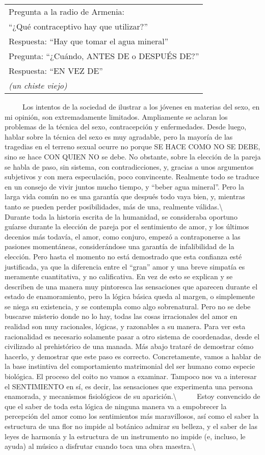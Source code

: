 \begin{longtable}[]{@{}l@{}}
\toprule
Pregunta a la radio de Armenia:\tabularnewline
``¿Qué contraceptivo hay que utilizar?''\tabularnewline
Respuesta: ``Hay que tomar el agua mineral''\tabularnewline
Pregunta: ``¿Cuándo, ANTES DE o DESPUÉS DE?''\tabularnewline
Respuesta: ``EN VEZ DE''\tabularnewline
\emph{(un chiste viejo)}\tabularnewline
\bottomrule
\end{longtable}

~ ~ ~ Los intentos de la sociedad de ilustrar a los jóvenes en materias
del sexo, en mi opinión, son extremadamente limitados. Ampliamente se
aclaran los problemas de la técnica del sexo, contracepción y
enfermedades. Desde luego, hablar sobre la técnica del sexo es muy
agradable, pero la mayoría de las tragedias en el terreno sexual ocurre
no porque SE HACE COMO NO SE DEBE, sino se hace CON QUIEN NO se debe. No
obstante, sobre la elección de la pareja se habla de paso, sin sistema,
con contradicciones, y, gracias a unos argumentos subjetivos y con mera
especulación, poco convincente. Realmente todo se traduce en un consejo
de vivir juntos mucho tiempo, y ``beber agua mineral''. Pero la larga
vida común no es una garantía que después todo vaya bien, y, mientras
tanto se pueden perder posibilidades, más de una, realmente
válidas.\textbackslash{} ~ ~ ~ Durante toda la historia escrita de la
humanidad, se consideraba oportuno guíarse durante la elección de pareja
por el sentimiento de amor, y los últimos decenios más todavía, el amor,
como conjuro, empezó a contraponerse a las pasiones momentáneas,
considerándose una garantía de infalibilidad de la elección. Pero hasta
el momento no está demostrado que esta confianza esté justificada, ya
que la diferencia entre el ``gran'' amor y una breve simpatía es
meramente cuantitativa, y no calificativa. En vez de esto se explican y
se describen de una manera muy pintoresca las sensaciones que aparecen
durante el estado de enamoramiento, pero la lógica básica queda al
margen, o simplemente se niega su existencia, y se contempla como algo
sobrenatural. Pero no se debe buscarse misterio donde no lo hay, todas
las cosas irracionales del amor en realidad son muy racionales, lógicas,
y razonables a su manera. Para ver esta racionalidad es necesario
solamente pasar a otro sistema de coordenadas, desde el civilizado al
prehistórico de una manada. Más abajo trataré de demostrar cómo hacerlo,
y demostrar que este paso es correcto. Concretamente, vamos a hablar de
la base instintiva del comportamiento matrimonial del ser humano como
especie biológica. El proceso del coito no vamos a examinar. Tampoco nos
va a interesar el SENTIMIENTO en sí, es decir, las sensaciones que
experimenta una persona enamorada, y mecanismos fisiológicos de su
aparición.\textbackslash{} ~ ~ ~ Estoy convencido de que el saber de
toda esta lógica de ninguna manera va a empobrecer la percepción del
amor como los sentimientos más maravillosos, así como el saber la
estructura de una flor no impide al botánico admirar su belleza, y el
saber de las leyes de harmonía y la estructura de un instrumento no
impide (e, incluso, le ayuda) al músico a disfrutar cuando toca una obra
maestra.\textbackslash{}

